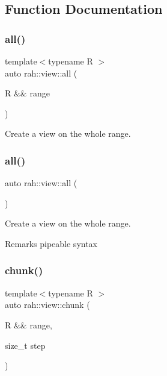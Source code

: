 \subsection{Function Documentation}
\mbox{\label{namespacerah_1_1view_acc7f1420accc862d2ac433ba9c697e95}} 
\subsubsection{\texorpdfstring{all()}{all()}\hspace{0.1cm}{\footnotesize\ttfamily [1/2]}}
{\footnotesize\ttfamily template$<$typename R $>$ \\
auto rah\+::view\+::all (\begin{DoxyParamCaption}\item[{R \&\&}]{range }\end{DoxyParamCaption})}



Create a view on the whole range. 

\mbox{\label{namespacerah_1_1view_aeed660f7f6a4e0fbefffa4e42de7642a}} 
\subsubsection{\texorpdfstring{all()}{all()}\hspace{0.1cm}{\footnotesize\ttfamily [2/2]}}
{\footnotesize\ttfamily auto rah\+::view\+::all (\begin{DoxyParamCaption}{ }\end{DoxyParamCaption})\hspace{0.3cm}{\ttfamily [inline]}}



Create a view on the whole range. 

\begin{DoxyRemark}{Remarks}
pipeable syntax 
\end{DoxyRemark}
\mbox{\label{namespacerah_1_1view_aa4ea72dd93cb1d17db2f4755bdee0cef}} 
\subsubsection{\texorpdfstring{chunk()}{chunk()}\hspace{0.1cm}{\footnotesize\ttfamily [1/2]}}
{\footnotesize\ttfamily template$<$typename R $>$ \\
auto rah\+::view\+::chunk (\begin{DoxyParamCaption}\item[{R \&\&}]{range,  }\item[{size\+\_\+t}]{step }\end{DoxyParamCaption})}



